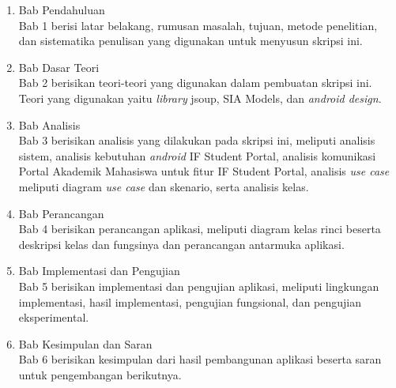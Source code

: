 \begin{enumerate}
  \item Bab Pendahuluan \\
  Bab 1 berisi latar belakang, rumusan masalah, tujuan, metode penelitian,
  dan sistematika penulisan yang digunakan untuk menyusun skripsi ini.
  \item Bab Dasar Teori \\
  Bab 2 berisikan teori-teori yang digunakan dalam pembuatan skripsi ini. Teori
  yang digunakan yaitu \textit{library} jsoup, SIA Models, dan \textit{android design}.
  \item Bab Analisis \\
  Bab 3 berisikan analisis yang dilakukan pada skripsi ini, meliputi analisis sistem, analisis kebutuhan \textit{android} IF Student Portal, analisis komunikasi Portal Akademik Mahasiswa untuk fitur IF Student Portal, analisis \textit{use case} meliputi diagram \textsl{use case} dan skenario, serta analisis kelas. 
	\item Bab Perancangan \\
  Bab 4 berisikan perancangan aplikasi, meliputi diagram kelas rinci beserta deskripsi kelas dan fungsinya dan perancangan antarmuka aplikasi.   \item Bab Implementasi dan Pengujian \\
  Bab 5 berisikan implementasi dan pengujian aplikasi, meliputi lingkungan implementasi, hasil implementasi, pengujian fungsional, dan pengujian eksperimental.
	\item Bab Kesimpulan dan Saran \\
  Bab 6 berisikan kesimpulan dari hasil pembangunan aplikasi beserta saran untuk pengembangan berikutnya.
\end{enumerate}
